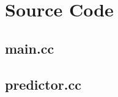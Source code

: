 \documentclass[]{report}   %
\begin{document}
\begin{enumerate}[I]

\end{enumerate}

\chapter{Source Code}
\section{main.cc}

\pagebreak

\section{predictor.cc}

\pagebreak



\end{document}
